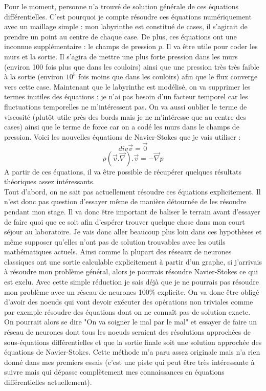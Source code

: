 \documentclass[10pt]{article}
\begin{document}
Pour le moment, personne n'a trouvé de solution générale de ces équations différentielles. C'est pourquoi je compte résoudre ces équations numériquement avec un maillage simple : mon labyrinthe est constitué de cases, il s'agirait de prendre un point au centre de chaque case. De plus, ces équations ont une inconnue supplémentaire : le champs de pression $p$. Il va être utile pour coder les murs et la sortie. Il s'agira de mettre une plus forte pression dans les murs (environ 100 fois plus que dans les couloirs) ainsi que une pression très très faible à la sortie (environ $10^{5}$ fois moins que dans les couloirs) afin que le flux converge vers cette case. Maintenant que le labyrinthe est modélisé, on va supprimer les termes inutiles des équations : je n'ai pas besoin d'un facteur temporel car les fluctuations temporelles ne m'intéressent pas. On va aussi oublier le terme de viscosité (plutôt utile près des bords mais je ne m'intéresse que au centre des cases) ainsi que le terme de force car on a codé les murs dans le champs de pression. Voici les nouvelles équations de Navier-Stokes que je vais utiliser :
\begin{equation}
div \overrightarrow{v} = \overrightarrow{0}
\end{equation}
\begin{equation}
\rho (\overrightarrow{v}.\overrightarrow{\nabla}).\overrightarrow{v}  = -\overrightarrow{\nabla} p
\end{equation}
A partir de ces équations, il va être possible de récupérer quelques résultats théoriques assez intéressants.\\ 
Tout d'abord, on ne sait pas actuellement résoudre ces équations explicitement. Il n'est donc pas question d'essayer même de manière détournée de les résoudre pendant mon stage. Il va donc être important de baliser le terrain avant d'essayer de faire quoi que ce soit afin d'espérer trouver quelque chose dans mon court séjour au laboratoire. Je vais donc aller beaucoup plus loin dans ces hypothèses et même supposer qu'elles n'ont pas de solution trouvables avec les outils mathématiques actuels. Ainsi comme la plupart des réseaux de neurones classiques ont une sortie calculable explicitement à partir d'un graphe, si j'arrivais à résoudre mon problème général, alors je pourrais résoudre Navier-Stokes ce qui est exclu. Avec cette simple réduction je sais déjà que je ne pourrais pas résoudre mon problème avec un réseau de neurones 100\% explicite. On va donc être obligé d'avoir des noeuds qui vont devoir exécuter des opérations non triviales comme par exemple résoudre des équations dont on ne connaît pas de solution exacte. On pourrait alors se dire "On va soigner le mal par le mal" et essayer de faire un réseau de neurones dont tous les noeuds seraient des résolutions approchées de sous-équations différentielles et que la sortie finale soit une solution approchée des équations de Navier-Stokes. Cette méthode m'a paru assez originale mais n'a rien donné dans mes premiers essais (c'est une piste qui peut être très intéressante à suivre mais qui dépasse complètement mes connaissances en équations différentielles actuellement). \\
\end{document}
